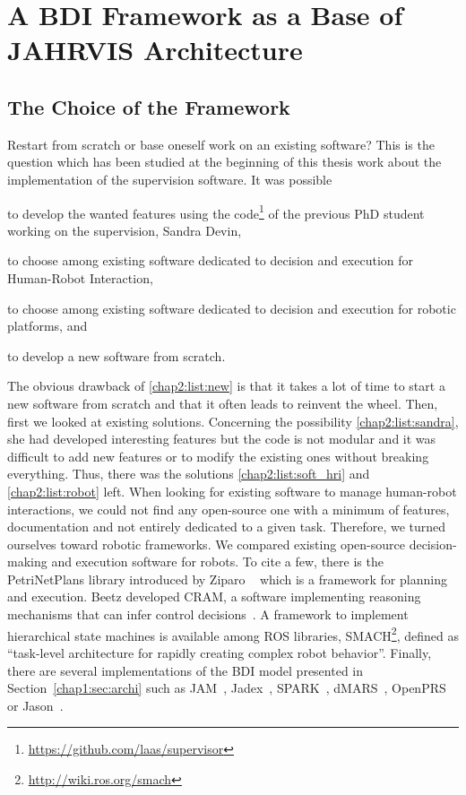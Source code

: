 \documentclass[a4paper,11pt,twoside]{StyleThese}
\begin{document}
\section{A BDI Framework as a Base of JAHRVIS Architecture}\label{chap2:sec:bdi}


\subsection{The Choice of the Framework}
Restart from scratch or base oneself work on an existing software? This is the question which has been studied at the beginning of this thesis work about the implementation of the supervision software. It was possible 
\begin{inlineEnumerate}
	\item to develop the wanted features using the code\footnote{\url{https://github.com/laas/supervisor}} of the previous PhD student working on the supervision, Sandra Devin,\label{chap2:list:sandra}
	\item to choose among existing software dedicated to decision and execution for Human-Robot Interaction,\label{chap2:list:soft_hri}
	\item to choose among existing software dedicated to decision and execution for robotic platforms, and\label{chap2:list:robot}
	\item to develop a new software from scratch.\label{chap2:list:new}
\end{inlineEnumerate}

The obvious drawback of \ref{chap2:list:new} is that it takes a lot of time to start a new software from scratch and that it often leads to reinvent the wheel. Then, first we looked at existing solutions. Concerning the possibility \ref{chap2:list:sandra}, she had developed interesting features but the code is not modular and it was difficult to add new features or to modify the existing ones without breaking everything. Thus, there was the solutions \ref{chap2:list:soft_hri} and \ref{chap2:list:robot} left. When looking for existing software to manage human-robot interactions, we could not find any open-source one with a minimum of features, documentation and not entirely dedicated to a given task. Therefore, we turned ourselves toward robotic frameworks. We compared existing open-source decision-making and execution software for robots. To cite a few, there is the PetriNetPlans library introduced by Ziparo \etal~\cite{ziparo_2011_petri} which is a framework for planning and execution. Beetz \etal{} developed CRAM, a software implementing reasoning mechanisms that can infer control decisions~\cite{beetz_2010_cram}. A framework to implement hierarchical state machines is available among ROS libraries, SMACH\footnote{\url{http://wiki.ros.org/smach}}, defined as ``task-level architecture for rapidly creating complex robot behavior''. Finally, there are several implementations of the BDI model presented in Section~\ref{chap1:sec:archi} such as JAM~\cite{huber_1999_jam}, Jadex~\cite{braudach_2005_jadex}, SPARK~\cite{morley_2004_spark}, dMARS~\cite{dinverno_1998_formal}, OpenPRS~\cite{ingrand_1996_prs} or Jason~\cite{bordini_2007_jason}. 
\end{document}
